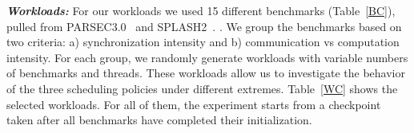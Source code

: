 \textbf{\textit{Workloads:}} For our workloads we used 15 different benchmarks (Table~\ref{BC}), pulled from PARSEC3.0~\cite{bienia11benchmarking} and SPLASH2~\cite{woo1995splash}.
. We group the benchmarks based on two criteria: a) synchronization intensity and b) communication vs computation intensity.
For each group, we randomly generate workloads with variable numbers of benchmarks and threads. These workloads allow us to investigate the behavior of the three scheduling policies under different extremes.
Table~\ref{WC} shows the selected workloads. 
For all of them, the experiment starts from a checkpoint taken after all benchmarks have completed their initialization.

